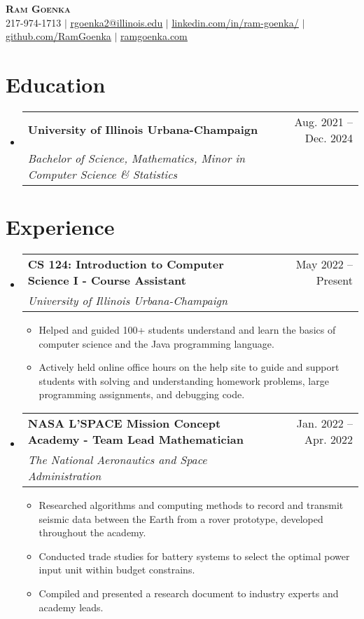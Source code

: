 \documentclass[letterpaper,11pt]{article}
\makeatletter
\newcommand{\resumeItem}[1]{
  \item\small{
    {#1 \vspace{-2pt}}
  }
}
\newcommand{\resumeSubheading}[4]{
  \vspace{-2pt}\item
    \begin{tabular*}{0.97\textwidth}[t]{l@{\extracolsep{\fill}}r}
      \textbf{#1} & #2 \\
      \textit{\small#3} & \textit{\small #4} \\
    \end{tabular*}\vspace{-7pt}
}
\newcommand{\resumeSubheading}[4]{
  \vspace{-2pt}\item
    \begin{tabular*}{0.97\textwidth}[t]{l@{\extracolsep{\fill}}r}
      \textbf{#1} & #2 \\
      \textit{\small#3} & \textit{\small #4} \\
    \end{tabular*}\vspace{-7pt}
}
\newcommand{\resumeSubHeadingListStart}{\begin{itemize}[leftmargin=0.15in, label={}]}
\newcommand{\resumeSubHeadingListEnd}{\end{itemize}}
\newcommand{\resumeItemListStart}{\begin{itemize}}
\newcommand{\resumeItemListEnd}{\end{itemize}\vspace{-5pt}}
\makeatother
\begin{document}
\begin{center}
    \textbf{\Huge \scshape Ram Goenka} \\ \vspace{1pt}
    \small 217-974-1713 $|$ \href{mailto:rgoenka2@illinois.edu}{\underline{rgoenka2@illinois.edu}} $|$ 
    \href{https://www.linkedin.com/in/ram-goenka/}{\underline{linkedin.com/in/ram-goenka/}} $|$
    \href{https://github.com/RamGoenka}{\underline{github.com/RamGoenka}} $|$
    \href{http://ramgoenka.com/}{\underline{ramgoenka.com}}
\end{center}

\section{Education}
  \resumeSubHeadingListStart
    \resumeSubheading
      {University of Illinois Urbana-Champaign}{Aug. 2021 -- Dec. 2024}
      {Bachelor of Science, Mathematics, Minor in Computer Science \& Statistics}{~}
  \resumeSubHeadingListEnd


\section{Experience}
  \resumeSubHeadingListStart

    \resumeSubheading
      {CS 124: Introduction to Computer Science I - Course Assistant}{May 2022 -- Present}
      {University of Illinois Urbana-Champaign}{~~}
      \resumeItemListStart
        \resumeItem{Helped and guided 100+ students understand and learn the basics of computer science and the Java programming language.}
        \resumeItem{Actively held online office hours on the help site to guide and support students with solving and understanding homework problems, large programming assignments, and debugging code.}
      \resumeItemListEnd
      
    \resumeSubheading
      {NASA L'SPACE Mission Concept Academy - Team Lead Mathematician}{Jan. 2022 -- Apr. 2022}
      {The National Aeronautics and Space Administration}{~~~~~~}
      \resumeItemListStart
        \resumeItem{Researched algorithms and computing methods to record and transmit seismic data between the Earth from a rover prototype, developed throughout the academy.}
        \resumeItem{Conducted trade studies for battery systems to select the optimal power input unit within budget constrains.}
        \resumeItem{Compiled and presented a research document to industry experts and academy leads.}
    \resumeItemListEnd
  \resumeSubHeadingListEnd
\end{document}
